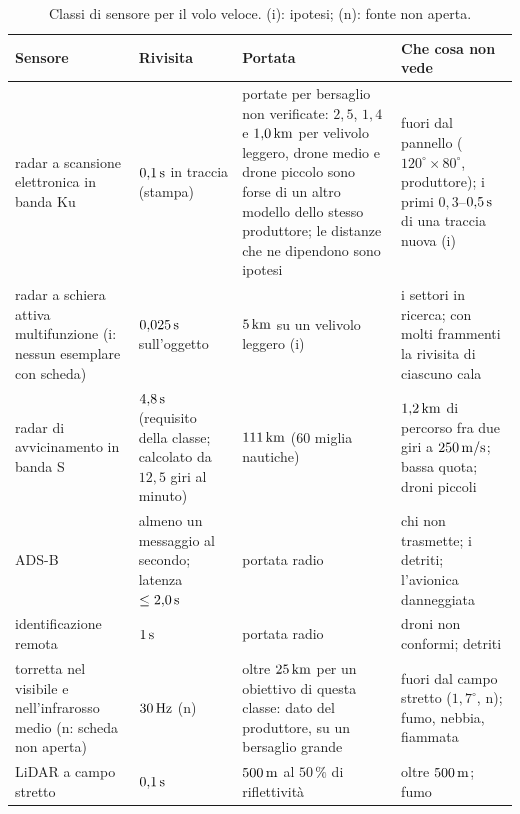 \begin{table}[H]\centering\footnotesize
\caption{Classi di sensore per il volo veloce. (i): ipotesi; (n): fonte non aperta.}\label{tab:vo-sensori}
\begin{tabularx}{\linewidth}{@{}>{\RaggedRight\arraybackslash}p{4.0cm}>{\RaggedRight\arraybackslash}p{1.8cm}>{\RaggedRight\arraybackslash}p{3.8cm}L@{}}
\toprule
Sensore & Rivisita & Portata & Che cosa non vede\\
\midrule
radar a scansione elettronica in banda Ku \citep{echodyne-tradegov-2024,echodyne-echoshield-news,dronedj2026-echodyne} & $0{,}1\,\mathrm{s}$ in traccia (stampa) & portate per bersaglio non verificate: $2{,}5$, $1{,}4$ e $1{,}0\,\mathrm{km}$ per velivolo leggero, drone medio e drone piccolo sono forse di un altro modello dello stesso produttore; le distanze che ne dipendono sono ipotesi & fuori dal pannello ($120^\circ\times80^\circ$, produttore); i primi $0{,}3$--$0{,}5\,\mathrm{s}$ di una traccia nuova (i)\\
radar a schiera attiva multifunzione (i: nessun esemplare con scheda) & $0{,}025\,\mathrm{s}$ sull'oggetto & $5\,\mathrm{km}$ su un velivolo leggero (i) & i settori in ricerca; con molti frammenti la rivisita di ciascuno cala\\
radar di avvicinamento in banda S \citep{stone1989,wikipedia-asr11} & $4{,}8\,\mathrm{s}$ (requisito della classe; calcolato da $12{,}5$ giri al minuto) & $111\,\mathrm{km}$ ($60$ miglia nautiche) & $1{,}2\,\mathrm{km}$ di percorso fra due giri a $250\,\mathrm{m/s}$; bassa quota; droni piccoli\\
ADS-B \cite{cfr-91-227} & almeno un messaggio al secondo; latenza $\le2{,}0\,\mathrm{s}$ & portata radio & chi non trasmette; i detriti; l'avionica danneggiata\\
identificazione remota \cite{cfr-89-310} & $1\,\mathrm{s}$ & portata radio & droni non conformi; detriti\\
torretta nel visibile e nell'infrarosso medio (n: scheda non aperta) & $30\,\mathrm{Hz}$ (n) & oltre $25\,\mathrm{km}$ per un obiettivo di questa classe: dato del produttore, su un bersaglio grande \citep{ophir-supir-50-1350} & fuori dal campo stretto ($1{,}7^\circ$, n); fumo, nebbia, fiammata\\
LiDAR a campo stretto \cite{livox-tele15} & $0{,}1\,\mathrm{s}$ & $500\,\mathrm{m}$ al $50\,\%$ di riflettività & oltre $500\,\mathrm{m}$; fumo\\
\bottomrule
\end{tabularx}
\end{table}

